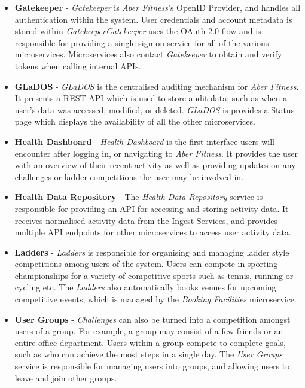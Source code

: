 \begin{itemize}
	\item \textbf{Gatekeeper} - \textit{Gatekeeper} is \textit{Aber Fitness}'s OpenID Provider, and handles all authentication within the system. User credentials and account metadata is stored within \textit{Gatekeeper}\textit{Gatekeeper} uses the OAuth 2.0 flow and is responsible for providing a single sign-on service for all of the various microservices. Microservices also contact \textit{Gatekeeper} to obtain and verify tokens when calling internal APIs.

	\item \textbf{GLaDOS} - \textit{GLaDOS} is the centralised auditing mechanism for \textit{Aber Fitness}. It presents a REST API which is used to store audit data; such as when a user's data was accessed, modified, or deleted. \textit{GLaDOS} is provides a Status page which displays the availability of all the other microservices.

	\item \textbf{Health Dashboard} - \textit{Health Dashboard} is the first interface users will encounter after logging in, or navigating to \textit{Aber Fitness}.  It provides the user with an overview of their recent activity as well as providing updates on any challenges or ladder competitions the user may be involved in.

	\item \textbf{Health Data Repository} - The \textit{Health Data Repository} service is responsible for providing an API for accessing and storing activity data. It receives normalised activity data from the Ingest Services, and provides multiple API endpoints for other microservices to access user activity data. 

	\item \textbf{Ladders} - \textit{Ladders} is responsible for organising and managing ladder style competitions among users of the system. Users can compete in sporting championships for a variety of competitive sports such as tennis, running or cycling etc. The \textit{Ladders} also automatically books venues for upcoming competitive events, which is managed by the \textit{Booking Facilities} microservice.

	\item \textbf{User Groups} - \textit{Challenges} can also be turned into a competition amongst users of a group. For example, a group may consist of a few friends or an entire office department. Users within a group compete to complete goals, such as who can achieve the most steps in a single day. The \textit{User Groups} service is responsible for managing users into groups, and allowing users to leave and join other groups.

\end{itemize}